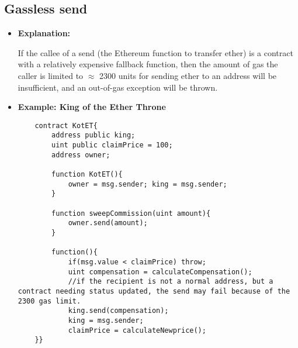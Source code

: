 \documentclass{llncs}
\begin{document}
\subsection{Gassless send}
\begin{itemize}
\item \textbf{Explanation:} 

If the callee of a send (the Ethereum function to transfer ether) is a contract with a relatively expensive fallback function, then the amount of gas the caller is limited to $ \approx $ 2300 units for sending ether to an address will be insufficient, and an out-of-gas exception will be thrown.

\item \textbf{Example: King of the Ether Throne}

	\begin{minipage}{.5\textwidth} 
	{\scriptsize
	\begin{verbatim}
	contract KotET{
	    address public king;
	    uint public claimPrice = 100;
	    address owner;
	    
	    function KotET(){
	        owner = msg.sender; king = msg.sender;
	    }
	    
	    function sweepCommission(uint amount){
	        owner.send(amount);
	    }
	    
	    function(){
	        if(msg.value < claimPrice) throw;
	        uint compensation = calculateCompensation();
	        //if the recipient is not a normal address, but a contract needing status updated, the send may fail because of the 2300 gas limit. 
	        king.send(compensation);
	        king = msg.sender;
	        claimPrice = calculateNewprice();
	}}
	\end{verbatim} }
	
	\end{minipage}

\end{itemize}
\end{document}
